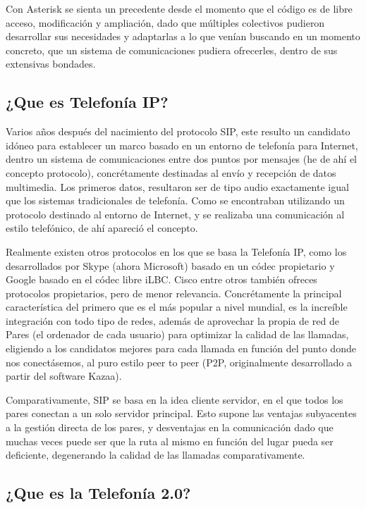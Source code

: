 Con Asterisk se sienta un precedente desde el momento que el código es de libre acceso, modificación y ampliación, dado que múltiples colectivos pudieron desarrollar sus necesidades y adaptarlas a lo que venían buscando en un momento concreto, que un sistema de comunicaciones pudiera ofrecerles, dentro de sus extensivas bondades. 

\subsection{¿Que es Telefonía IP?}

Varios años después del nacimiento del protocolo SIP, este resulto un candidato idóneo para establecer un marco basado en un entorno de telefonía para Internet, dentro un sistema de comunicaciones entre dos puntos por mensajes (he de ahí el concepto protocolo), concrétamente destinadas al envío y recepción de datos multimedia. Los primeros datos, resultaron ser de tipo audio exactamente igual que los sistemas tradicionales de telefonía. Como se encontraban utilizando un protocolo destinado al entorno de Internet, y se realizaba una comunicación al estilo telefónico, de ahí apareció el concepto.

Realmente existen otros protocolos en los que se basa la Telefonía IP, como los desarrollados por Skype (ahora Microsoft) basado en un códec propietario y Google basado en el códec libre iLBC. Cisco entre otros también ofreces protocolos propietarios, pero de menor relevancia. Concrétamente la principal característica del primero que es el más popular a nivel mundial, es la increíble integración con todo tipo de redes, además de aprovechar la propia de red de Pares (el ordenador de cada usuario) para optimizar la calidad de las llamadas, eligiendo a los candidatos mejores para cada llamada en función del punto donde nos conectásemos, al puro estilo peer to peer (P2P, originalmente desarrollado a partir del software Kazaa). 

Comparativamente, SIP se basa en la idea cliente servidor, en el que todos los pares conectan a un solo servidor principal. Esto supone las ventajas subyacentes a la gestión directa de los pares, y desventajas en la comunicación dado que muchas veces puede ser que la ruta al mismo en función del lugar pueda ser deficiente, degenerando la calidad de las llamadas comparativamente.

\subsection{¿Que es la Telefonía 2.0?}

